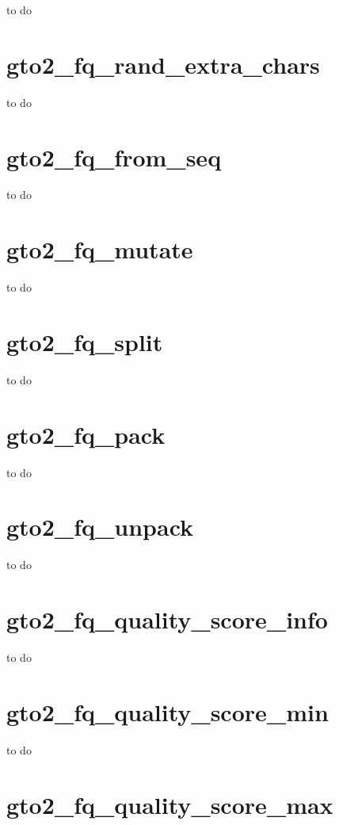 \documentclass[11pt,]{krantz}
\begin{document}
to do

\section{gto2\_fq\_rand\_extra\_chars}\label{gto2_fq_rand_extra_chars}

to do

\section{gto2\_fq\_from\_seq}\label{gto2_fq_from_seq}

to do

\section{gto2\_fq\_mutate}\label{gto2_fq_mutate}

to do

\section{gto2\_fq\_split}\label{gto2_fq_split}

to do

\section{gto2\_fq\_pack}\label{gto2_fq_pack}

to do

\section{gto2\_fq\_unpack}\label{gto2_fq_unpack}

to do

\section{gto2\_fq\_quality\_score\_info}\label{gto2_fq_quality_score_info}

to do

\section{gto2\_fq\_quality\_score\_min}\label{gto2_fq_quality_score_min}

to do

\section{gto2\_fq\_quality\_score\_max}\label{gto2_fq_quality_score_max}
\end{document}
